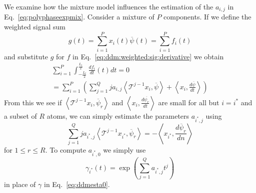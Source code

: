\documentclass[twoside,a4paper]{article}
\begin{document}
We examine how the mixture model influences the estimation of the $a_{i,j}$ in
Eq.~\ref{eq:polyphaseexpmix}.
Consider a mixture of $P$ components.
If we define the weighted signal sum
%
\[
    g(t) = \sum_{i=1}^{P} x_{i}(t) \overline{\psi}(t) = \sum_{i=1}^{P} f_{i}(t)
\]
%
and substitute $g$ for $f$ in Eq.~\ref{eq:ddm:weighted:sig:derivative} we obtain
%
\begin{multline}
    \label{eq:mixest}
    \sum_{i=1}^{P} \int_{-\frac{L_{t}}{2}}^{\frac{L_{t}}{2}}
    \frac{df_{i}}{dt}(t)dt =
    0
    \\ = 
    \sum_{i=1}^{P} \left(
    \sum_{j=1}^{Q} j a_{i,j} 
    \left\langle \mathcal{T}^{j-1} x_i , \overline{\psi} \right\rangle
    + \left\langle x_i, \frac{d\overline{\psi}}{dt} \right\rangle \right)
\end{multline}
%
From this we see if $\left\langle \mathcal{T}^{j-1} x_i , \overline{\psi}_{r}
\right\rangle$ and $\left\langle x_i, \frac{d\overline{\psi_{r}}}{dt} \right\rangle$
are small for all but $i = i^{\ast}$ and a subset of $R$ atoms, we
can simply estimate the parameters $a_{i^{\ast},j}$ using
\[
    \sum_{j=1}^{Q} j a_{{i^{\ast}},j} 
    \left\langle \mathcal{T}^{j-1} x_{i^{\ast}} , \overline{\psi}_{r} \right\rangle
    = -\left\langle x_{i^{\ast}}, \frac{d\overline{\psi}_{r}}{dn} \right\rangle
\]
for $1 \leq r \leq R$. To compute $a_{i^{\ast},0}$ we simply use
\[
    \gamma_{i^{\ast}}(t) = \exp \left( \sum_{j=1}^{Q} a_{i^{\ast},j} t^{j} \right)
\]
in place of $\gamma$ in Eq.~\ref{eq:ddmesta0}.
\end{document}
